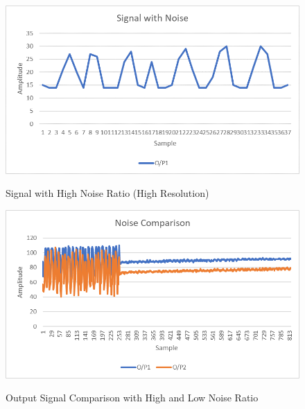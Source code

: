 	\begin{figure}
		\begin{center}
		\includegraphics[width=1\textwidth]{Pics/3}
		\caption{Signal with High Noise Ratio (High Resolution)}
		\label{fig:4.1}
		\vspace{2cm}
		\includegraphics[width=1\textwidth]{Pics/1}
		\caption{Output Signal Comparison with High and Low Noise Ratio}
		\label{fig:4.2}
		\vspace{2cm}
	\end{center}
	\end{figure}
		\newpage
